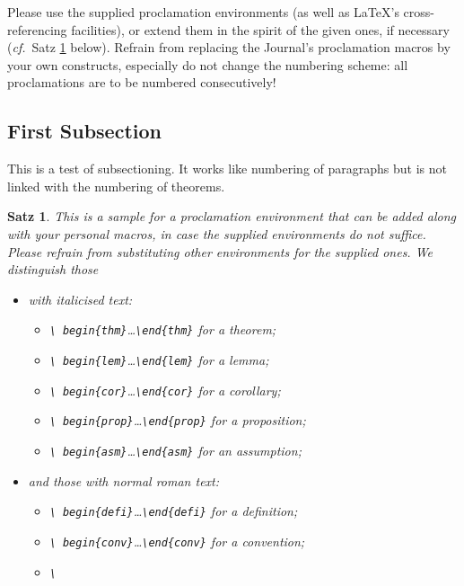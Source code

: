 \documentclass{lmcs} %
\theoremstyle{plain}\newtheorem{satz}[thm]{Satz} %
\def\cf{{\em cf.}}
\begin{document}
  Please use the supplied proclamation environments (as well as
  LaTeX's cross-referencing facilities), or extend them in the spirit
  of the given ones, if necessary (\cf~Satz \ref{T:big} below).
  Refrain from replacing the Journal's proclamation macros by your own
  constructs, especially do not change the numbering scheme: all
  proclamations are to be numbered consecutively!

\subsection{First Subsection}

  This is a test of subsectioning.  It works like numbering of
  paragraphs but is not linked with the numbering of theorems.

\begin{satz}\label{T:big}
  This is a sample for a proclamation environment that can be added
  along with your personal macros, \emph{in case the supplied
    environments do not suffice}.  Please refrain from substituting
  other environments for the supplied ones.  We distinguish those
\begin{itemize}
\item with italicised text:
\begin{itemize}
\item\emph{\texttt{\textbackslash
    begin\{thm\}}\dots\texttt{\textbackslash end\{thm\}}} for a theorem;
\item\emph{\texttt{\textbackslash
    begin\{lem\}}\dots\texttt{\textbackslash end\{lem\}}} for a lemma;
\item\emph{\texttt{\textbackslash
    begin\{cor\}}\dots\texttt{\textbackslash end\{cor\}}} for a corollary;
\item\emph{\texttt{\textbackslash
    begin\{prop\}}\dots\texttt{\textbackslash end\{prop\}}} for a proposition;
\item\emph{\texttt{\textbackslash
    begin\{asm\}}\dots\texttt{\textbackslash end\{asm\}}} for an
  assumption;
\end{itemize}
\item  and those with normal roman text:
\begin{itemize}
\item\emph{\texttt{\textbackslash
    begin\{defi\}}\dots\texttt{\textbackslash end\{defi\}}} for a definition;
\item\emph{\texttt{\textbackslash
    begin\{conv\}}\dots\texttt{\textbackslash end\{conv\}}} for a convention;
\item\emph{\texttt{\textbackslash
}}
\end{itemize}
\end{itemize}
\end{satz}
\end{document}
